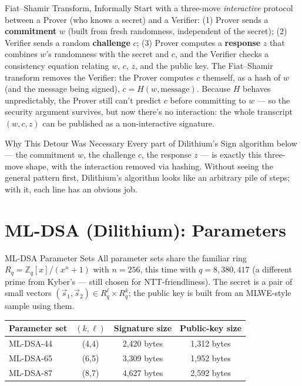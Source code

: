 \begin{defbox}{Fiat--Shamir Transform, Informally}
Start with a three-move \emph{interactive} protocol between a Prover (who knows a secret) and a Verifier: (1) Prover sends a \textbf{commitment} $w$ (built from fresh randomness, independent of the secret); (2) Verifier sends a random \textbf{challenge} $c$; (3) Prover computes a \textbf{response} $z$ that combines $w$'s randomness with the secret and $c$, and the Verifier checks a consistency equation relating $w$, $c$, $z$, and the public key. The Fiat--Shamir transform removes the Verifier: the Prover computes $c$ themself, as a hash of $w$ (and the message being signed), $c = H(w, \text{message})$. Because $H$ behaves unpredictably, the Prover still can't predict $c$ before committing to $w$ --- so the security argument survives, but now there's no interaction: the whole transcript $(w,c,z)$ can be published as a non-interactive signature.
\end{defbox}

\begin{rmkbox}{Why This Detour Was Necessary}
Every part of Dilithium's Sign algorithm below --- the commitment $w$, the challenge $c$, the response $z$ --- is exactly this three-move shape, with the interaction removed via hashing. Without seeing the general pattern first, Dilithium's algorithm looks like an arbitrary pile of steps; with it, each line has an obvious job.
\end{rmkbox}

\section{ML-DSA (Dilithium): Parameters}
\label{sec:L4:ml-dsa-dilithium-parameters}

\begin{defbox}{ML-DSA Parameter Sets}
All parameter sets share the familiar ring $R_q = \mathbb{Z}_q[x]/(x^n+1)$ with $n=256$, this time with $q = 8{,}380{,}417$ (a different prime from Kyber's --- still chosen for NTT-friendliness). The secret is a pair of small vectors $(\vec s_1,\vec s_2) \in R_q^\ell \times R_q^k$; the public key is built from an MLWE-style sample using them.
\begin{center}
\begin{tabular}{|l|c|c|c|}
\hline
\textbf{Parameter set} & $(k,\ell)$ & Signature size & Public-key size \\
\hline
ML-DSA-44 & (4,4) & 2{,}420 bytes & 1{,}312 bytes \\
ML-DSA-65 & (6,5) & 3{,}309 bytes & 1{,}952 bytes \\
ML-DSA-87 & (8,7) & 4{,}627 bytes & 2{,}592 bytes \\
\hline
\end{tabular}
\end{center}
\end{defbox}

